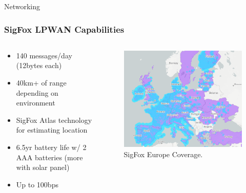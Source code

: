 \documentclass{beamer}
\begin{document}
  \begin{frame}{Networking}
    \frametitle{SigFox LPWAN Capabilities}
    \begin{columns}
      \begin{column}{0.5\textwidth}
        \begin{itemize}
          \item 140 messages/day (12bytes each)
          \item 40km+ of range depending on environment
          \item SigFox Atlas technology for estimating location
          \item 6.5yr battery life w/ 2 AAA batteries (more with solar panel)
          \item Up to 100bps
        \end{itemize}
      \end{column}
      \begin{column}{0.5\textwidth}
        \begin{figure}[htbp]
          \centering
          \includegraphics[width=\textwidth]{SigFoxCoverage.png}
          \caption{SigFox Europe Coverage.\cite{Sigfox_0G_Technology_2024}}
          \label{fig:SigFox_Coverage}
        \end{figure}
      \end{column}
    \end{columns}
  \end{frame}
\end{document}
